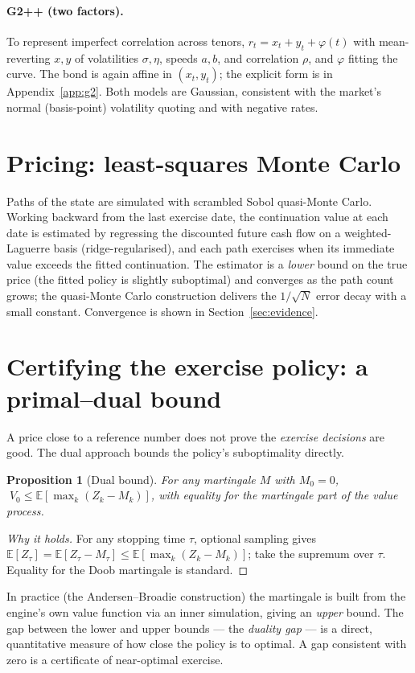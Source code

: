\documentclass[11pt]{article}
\theoremstyle{plain}
\newtheorem{proposition}{Proposition}
\theoremstyle{definition}
\newcommand{\E}{\mathbb{E}}
\begin{document}
\paragraph{G2++ (two factors).} To represent imperfect correlation across tenors,
$r_t=x_t+y_t+\varphi(t)$ with mean-reverting $x,y$ of volatilities $\sigma,\eta$, speeds $a,b$,
and correlation $\rho$, and $\varphi$ fitting the curve. The bond is again affine in $(x_t,y_t)$;
the explicit form is in Appendix~\ref{app:g2}. Both models are Gaussian, consistent with the
market's normal (basis-point) volatility quoting and with negative rates.

\section{Pricing: least-squares Monte Carlo}
\label{sec:lsmc}
Paths of the state are simulated with scrambled Sobol quasi-Monte Carlo. Working backward from
the last exercise date, the continuation value at each date is estimated by regressing the
discounted future cash flow on a weighted-Laguerre basis (ridge-regularised), and each path
exercises when its immediate value exceeds the fitted continuation. The estimator is a
\emph{lower} bound on the true price (the fitted policy is slightly suboptimal) and converges as
the path count grows; the quasi-Monte Carlo construction delivers the $1/\sqrt{N}$ error decay
with a small constant. Convergence is shown in Section~\ref{sec:evidence}.

\section{Certifying the exercise policy: a primal--dual bound}
\label{sec:dual}
A price close to a reference number does not prove the \emph{exercise decisions} are good. The
dual approach bounds the policy's suboptimality directly.
\begin{proposition}[Dual bound]
\label{prop:dual}
For any martingale $M$ with $M_0=0$, $\;V_0\le\E[\max_{k}(Z_k-M_k)]$, with equality for the
martingale part of the value process.
\end{proposition}
\begin{proof}[Why it holds]
For any stopping time $\tau$, optional sampling gives $\E[Z_\tau]=\E[Z_\tau-M_\tau]\le
\E[\max_k(Z_k-M_k)]$; take the supremum over $\tau$. Equality for the Doob martingale is standard.
\end{proof}
In practice (the Andersen--Broadie construction) the martingale is built from the engine's own
value function via an inner simulation, giving an \emph{upper} bound. The gap between the lower
and upper bounds --- the \emph{duality gap} --- is a direct, quantitative measure of how close
the policy is to optimal. A gap consistent with zero is a certificate of near-optimal exercise.
\end{document}
